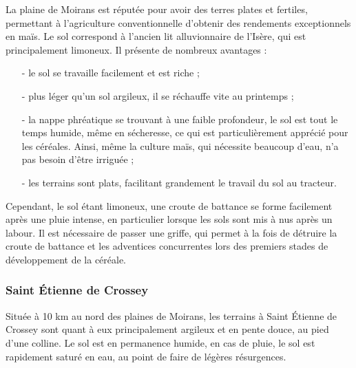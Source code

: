 \documentclass{article}
\begin{document}
La plaine de Moirans est réputée pour avoir des terres plates et fertiles, permettant à l'agriculture conventionnelle d'obtenir des rendements exceptionnels en maïs. Le sol correspond à l'ancien lit alluvionnaire de l'Isère, qui est principalement limoneux. Il présente de nombreux avantages : 
\begin{itemize}
	\item[-] le sol se travaille facilement et est riche ;
	\item[-] plus léger qu'un sol argileux, il se réchauffe vite au printemps ;
	\item[-] la nappe phréatique se trouvant à une faible profondeur, le sol est tout le temps humide, même en sécheresse, ce qui est particulièrement apprécié pour les céréales. Ainsi, même la culture maïs, qui nécessite beaucoup d'eau, n'a pas besoin d'être irriguée ;
	\item[-] les terrains sont plats, facilitant grandement le travail du sol au tracteur. 
\end{itemize}
Cependant, le sol étant limoneux, une croute de battance se forme facilement après une pluie intense, en particulier lorsque les sols sont mis à nus après un labour. Il est nécessaire de passer une griffe, qui permet à la fois de détruire la croute de battance et les adventices concurrentes lors des premiers stades de développement de la céréale. 


\subsubsection*{Saint Étienne de Crossey}

Située à 10 km au nord des plaines de Moirans, les terrains à Saint Étienne de Crossey sont quant à eux principalement argileux et en pente douce, au pied d'une colline. Le sol est en permanence humide, en cas de pluie, le sol est rapidement saturé en eau, au point de faire de légères résurgences. 
\end{document}
